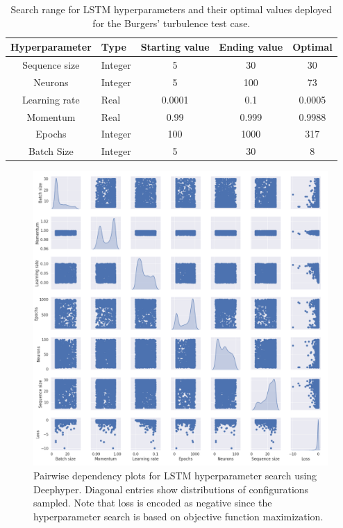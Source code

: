 \documentclass[preprint,12pt]{elsarticle}
\begin{document}
\begin{table}[]
\begin{tabular}{|c|l|c|c|c|}
\hline
Hyperparameter & Type    & Starting value & Ending value & Optimal \\ \hline
Sequence size  & Integer & 5              & 30           & 30       \\ \hline
Neurons        & Integer & 5              & 100          & 73      \\ \hline
Learning rate  & Real    & 0.0001         & 0.1          & 0.0005 \\ \hline
Momentum       & Real    & 0.99           & 0.999        & 0.9988  \\ \hline
Epochs         & Integer & 100            & 1000         & 317     \\ \hline
Batch Size     & Integer & 5              & 30           & 8      \\ \hline
\end{tabular}
\caption{Search range for LSTM hyperparameters and their optimal values deployed for the Burgers' turbulence test case.}
\label{Table1}
\end{table}

\begin{figure}
	\centering
	\includegraphics[width=\textwidth]{Figure_18.pdf}
	\caption{Pairwise dependency plots for LSTM hyperparameter search using Deephyper. Diagonal entries show distributions of configurations sampled. Note that loss is encoded as negative since the hyperparameter search is based on objective function maximization.}
	\label{Figure13}
\end{figure}
\end{document}
